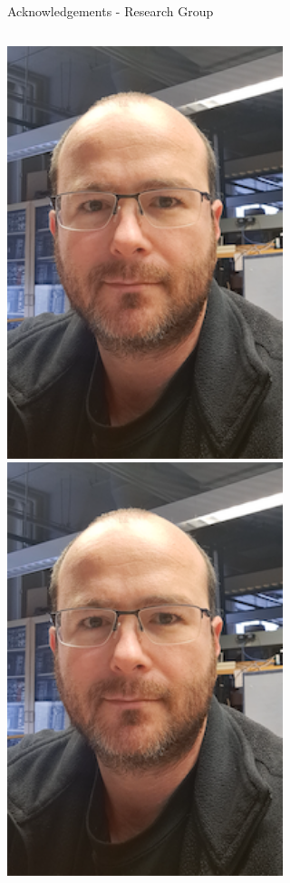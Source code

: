 \documentclass[aspectratio=169]{beamer}
\begin{document}
\begin{frame}{Acknowledgements - Research Group}
\begin{columns}
            \includegraphics[width=0.75\textwidth]{people/actual_mrg/igor.png}
            \includegraphics[width=0.75\textwidth]{people/actual_mrg/igor.png}
    \end{columns}            
\end{frame}
\end{document}
